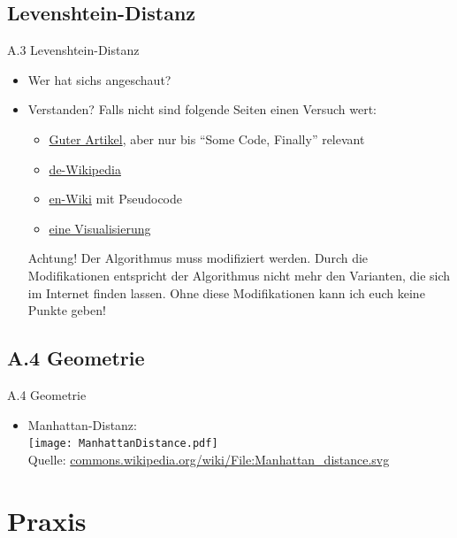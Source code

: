 \documentclass[usepdftitle=false,hyperref={pdfpagelabels=false}]{beamer}
\begin{document}
\subsection{Levenshtein-Distanz}
\begin{frame}{A.3 Levenshtein-Distanz}
  \begin{itemize}[<+->]
    \item Wer hat sichs angeschaut?
    \item Verstanden? Falls nicht sind folgende Seiten einen Versuch wert:
    \begin{itemize}
        \item \href{http://oldfashionedsoftware.com/tag/levenshtein-distance/}{Guter Artikel}, aber nur bis "`Some Code, Finally"' relevant
        \item \href{http://de.wikipedia.org/wiki/Levenshtein-Distanz}{de-Wikipedia}
        \item \href{http://en.wikipedia.org/wiki/Levenshtein_Distance\#Computing_Levenshtein_distance}{en-Wiki} mit Pseudocode
        \item \href{http://www-igm.univ-mlv.fr/~lecroq/seqcomp/node2.html}{eine Visualisierung}
    \end{itemize}
    \begin{alertblock}{Achtung!}
      Der Algorithmus muss modifiziert werden. Durch die Modifikationen entspricht
      der Algorithmus nicht mehr den Varianten, die sich im Internet finden lassen.
      Ohne diese Modifikationen kann ich euch keine Punkte geben!
    \end{alertblock}
  \end{itemize}
\end{frame}

\subsection{A.4 Geometrie}
\begin{frame}{A.4 Geometrie}
  \begin{itemize}[<+->]
    \item Manhattan-Distanz:\\
        \texttt{[image: ManhattanDistance.pdf]}\\
        \tiny{Quelle: \href{http://commons.wikimedia.org/wiki/File:Manhattan\_distance.svg}{commons.wikipedia.org/wiki/File:Manhattan\_distance.svg}}
  \end{itemize}
\end{frame}

\section{Praxis}
\end{document}
